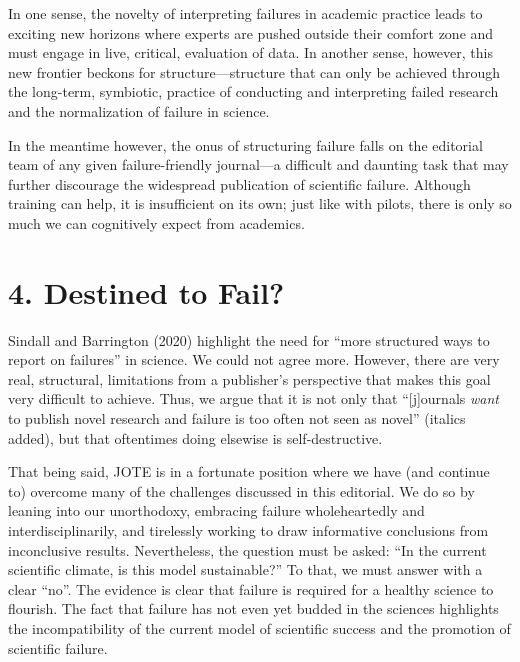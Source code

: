 \documentclass[empirical, author-date]{jote-article}
\begin{document}
In one sense, the novelty of interpreting failures in academic practice leads to exciting new horizons where experts are pushed outside their comfort zone and must engage in live, critical, evaluation of data. In another sense, however, this new frontier beckons for structure—structure that can only be achieved through the long-term, symbiotic, practice of conducting and interpreting failed research and the normalization of failure in science.

In the meantime however, the onus of structuring failure falls on the editorial team of any given failure-friendly journal—a difficult and daunting task that may further discourage the widespread publication of scientific failure. Although training can help, it is insufficient on its own; just like with pilots, there is only so much we can cognitively expect from academics. 

\section{}

\section{4. Destined to Fail?}

\textbf{}Sindall and Barrington (2020) highlight the need for “more structured ways to report on failures” in science. We could not agree more. However, there are very real, structural, limitations from a publisher's perspective that makes this goal very difficult to achieve. Thus, we argue that it is not only that “[j]ournals \emph{want} to publish novel research and failure is too often not seen as novel” (italics added), but that oftentimes doing elsewise is self-destructive. 

That being said, JOTE is in a fortunate position where we have (and continue to) overcome many of the challenges discussed in this editorial. We do so by leaning into our unorthodoxy, embracing failure wholeheartedly and interdisciplinarily, and tirelessly working to draw informative conclusions from inconclusive results. Nevertheless, the question must be asked: “In the current scientific climate, is this model sustainable?” To that, we must answer with a clear “no”. The evidence is clear that failure is required for a healthy science to flourish. The fact that failure has not even yet budded in the sciences highlights the incompatibility of the current model of scientific success and the promotion of scientific failure. 
\end{document}
